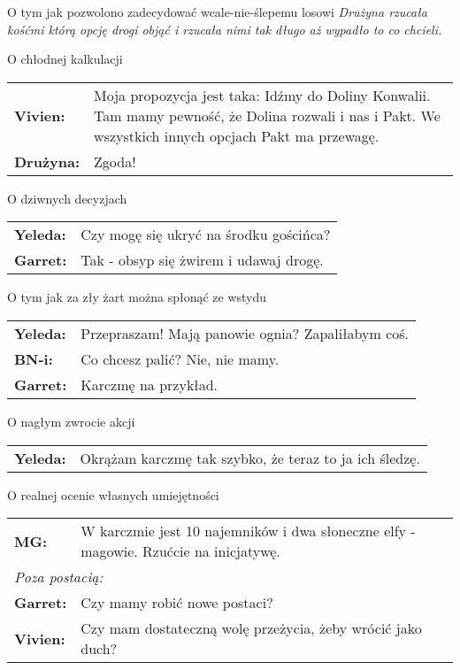 \documentclass[10pt,twoside,twocolumn]{book}
\begin{document}
\begin{rpg-quotebox}{O tym jak pozwolono zadecydować wcale-nie-ślepemu losowi}
   \textit{Drużyna rzucała kośćmi którą opcję drogi objąć i rzucała nimi tak długo aż wypadło to co chcieli.}
\end{rpg-quotebox}

\begin{rpg-quotebox}{O chłodnej kalkulacji}
   \begin{tabularx}{\columnwidth}{lX}
      \textbf{Vivien:} & Moja propozycja jest taka: Idźmy do Doliny Konwalii. Tam mamy pewność, że Dolina rozwali i nas i Pakt. We wszystkich innych opcjach Pakt ma przewagę.\\
      \textbf{Drużyna:} & Zgoda!\\
   \end{tabularx}
\end{rpg-quotebox}

\begin{rpg-quotebox}{O dziwnych decyzjach}
   \begin{tabularx}{\columnwidth}{lX}
      \textbf{Yeleda:} & Czy mogę się ukryć na środku gościńca?\\
      \textbf{Garret:} & Tak - obsyp się żwirem i udawaj drogę.\\
   \end{tabularx}
\end{rpg-quotebox}

\begin{rpg-quotebox}{O tym jak za zły żart można spłonąć ze wstydu}
   \begin{tabularx}{\columnwidth}{lX}
      \textbf{Yeleda:} & Przepraszam! Mają panowie ognia? Zapaliłabym coś.\\
      \textbf{BN-i:} & Co chcesz palić? Nie, nie mamy.\\
      \textbf{Garret:} & Karczmę na przykład.\\
   \end{tabularx}
\end{rpg-quotebox}

\begin{rpg-quotebox}{O nagłym zwrocie akcji}
   \begin{tabularx}{\columnwidth}{lX}
      \textbf{Yeleda:} & Okrążam karczmę tak szybko, że teraz to ja ich śledzę.\\
   \end{tabularx}
\end{rpg-quotebox}

\begin{rpg-quotebox}{O realnej ocenie własnych umiejętności}
   \begin{tabularx}{\columnwidth}{lX}
      \textbf{MG:} & W karczmie jest 10 najemników i dwa słoneczne elfy - magowie. Rzućcie na inicjatywę.\\
      \multicolumn{2}{l}{\textit{Poza postacią:}}\\
      \textbf{Garret:} & Czy mamy robić nowe postaci?\\
      \textbf{Vivien:} & Czy mam dostateczną wolę przeżycia, żeby wrócić jako duch?\\
   \end{tabularx}
\end{rpg-quotebox}
\end{document}
